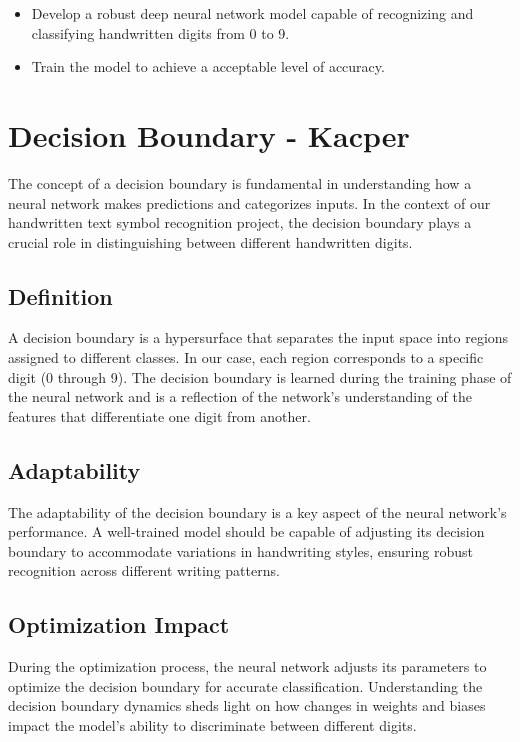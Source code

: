 \documentclass{article}
\begin{document}
\begin{itemize}
    \item Develop a robust deep neural network model capable of recognizing and classifying handwritten digits from 0 to 9.
    \item Train the model to achieve a acceptable level of accuracy.
\end{itemize}

\newpage
\section{Decision Boundary - Kacper}

The concept of a decision boundary is fundamental in understanding how a neural network makes predictions and categorizes inputs. In the context of our handwritten text symbol recognition project, the decision boundary plays a crucial role in distinguishing between different handwritten digits.

\subsection{Definition}
A decision boundary is a hypersurface that separates the input space into regions assigned to different classes. In our case, each region corresponds to a specific digit (0 through 9). The decision boundary is learned during the training phase of the neural network and is a reflection of the network's understanding of the features that differentiate one digit from another.

\subsection{Adaptability}
The adaptability of the decision boundary is a key aspect of the neural network's performance. A well-trained model should be capable of adjusting its decision boundary to accommodate variations in handwriting styles, ensuring robust recognition across different writing patterns.

\subsection{Optimization Impact}
During the optimization process, the neural network adjusts its parameters to optimize the decision boundary for accurate classification. Understanding the decision boundary dynamics sheds light on how changes in weights and biases impact the model's ability to discriminate between different digits.
\end{document}
